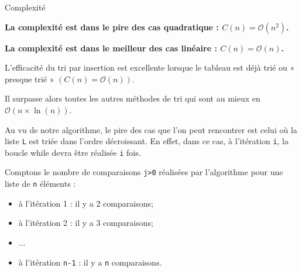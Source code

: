 \begin{prop}{Complexité}
%
%
%


\textbf{La complexité est dans le pire des cas quadratique : $C(n)=\mathcal{O}(n^2)$.}

\textbf{La complexité est dans le meilleur des cas linéaire : $C(n)=\mathcal{O}(n)$.}
 

L'efficacité du tri par insertion est excellente lorsque le tableau est déjà trié ou « presque trié » $(C(n)=\mathcal{O}(n))$. 

Il surpasse alors toutes les autres méthodes de tri qui sont au mieux en $\mathcal{O}(n \times \ln(n))$.
\end{prop}


Au vu de notre algorithme, le pire des cas que l'on peut rencontrer est celui où la liste \texttt{L} est triée dans l'ordre décroissant. En effet, dans ce cas, à l'itération \texttt{i}, la boucle while devra être réalisée \texttt{i} fois. 

Comptons le nombre de comparaisons \texttt{j>0} réalisées par l'algorithme pour une liste de \texttt{n} éléments :
\begin{itemize}
\item à l'itération 1 : il y a 2 comparaisons; 
\item à l'itération 2 : il y a 3 comparaisons; 
\item ...
\item à l'itération \texttt{n-1} : il y a \texttt{n} comparaisons.
\end{itemize}

